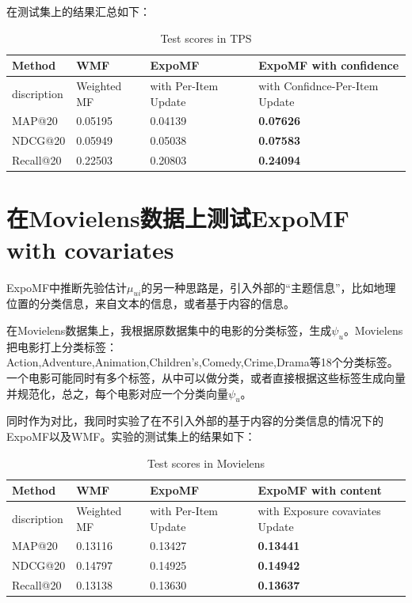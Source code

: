 \documentclass[notitlepage,cs4size,punct,oneside]{ctexrep}
\numberwithin{equation}{chapter}
\theoremstyle{mystyle}
\begin{document}
在测试集上的结果汇总如下：
\begin{table}[htbp]\centering
\begin{tabular}{llll}
\hline\hline
Method             & WMF          & ExpoMF     					 &ExpoMF with confidence\\
\hline
discription  	  &Weighted MF    & with Per-Item Update         &  with Confidnce-Per-Item Update\\
MAP@20  		  & 0.05195       & 0.04139       	    &   \textbf{0.07626}\\
NDCG@20           & 0.05949       & 0.05038             &   \textbf{0.07583}\\
Recall@20         & 0.22503       & 0.20803             &   \textbf{0.24094}\\
\hline
\end{tabular}
\caption{Test scores in TPS}\label{tab:performance_tps}
\end{table}

\section{在Movielens数据上测试ExpoMF with covariates}

ExpoMF中推断先验估计$\mu_{ui}$的另一种思路是，引入外部的“主题信息”，比如地理位置的分类信息，来自文本的信息，或者基于内容的信息。

在Movielens数据集上，我根据原数据集中的电影的分类标签，生成$\psi_u$。Movielens把电影打上分类标签：Action,Adventure,Animation,Children's,Comedy,Crime,Drama等18个分类标签。一个电影可能同时有多个标签，从中可以做分类，或者直接根据这些标签生成向量并规范化，总之，每个电影对应一个分类向量$\psi_u$。

同时作为对比，我同时实验了在不引入外部的基于内容的分类信息的情况下的ExpoMF以及WMF。实验的测试集上的结果如下：
\begin{table}[htbp]\centering
\begin{tabular}{llll}
\hline\hline
Method             & WMF          & ExpoMF     					 &ExpoMF with content\\
\hline
discription  	  &Weighted MF    & with Per-Item Update         &  with Exposure covaviates Update\\
MAP@20  		  & 0.13116       & 0.13427      	    &   \textbf{0.13441}\\
NDCG@20           & 0.14797       & 0.14925             &   \textbf{0.14942}\\
Recall@20         & 0.13138       & 0.13630             &   \textbf{0.13637}\\
\hline
\end{tabular}
\caption{Test scores in Movielens}\label{tab:performance_movie}
\end{table}
\end{document}
